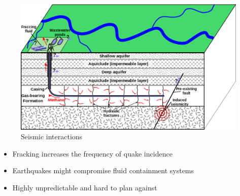 \begin{frame}
	\begin{figure}
		\includegraphics[scale=0.5]{quake.png}
		\caption{Seismic interactions}
	\end{figure}
\end{frame}

\begin{frame}
	\begin{itemize}
		\item Fracking increases the frequency of quake incidence
		\item Earthquakes might compromise fluid containment systems
		\item Highly unpredictable and hard to plan against
	\end{itemize}
\end{frame}